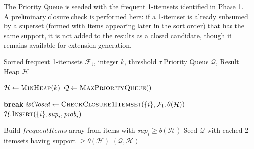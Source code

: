 \documentclass[10pt,letterpaper]{article}
\begin{document}
The Priority Queue is seeded with the frequent 1-itemsets identified in Phase 1. A preliminary closure check is performed here: if a 1-itemset is already subsumed by a superset (formed with items appearing later in the sort order) that has the same support, it is not added to the results as a closed candidate, though it remains available for extension generation.


\begin{algorithm}[H]
\caption{Phase 2: Initialization}
\label{alg:phase2}
\begin{algorithmic}[1]
\footnotesize
\REQUIRE Sorted frequent 1-itemsets $\mathcal{F}_1$, integer $k$, threshold $\tau$
\ENSURE Priority Queue $\mathcal{Q}$, Result Heap $\mathcal{H}$

\STATE $\mathcal{H} \leftarrow \textsc{MinHeap}(k)$
\STATE $\mathcal{Q} \leftarrow \textsc{MaxPriorityQueue}()$

        \STATE \textbf{break}
    \ENDIF
    \STATE $\mathit{isClosed} \leftarrow \textsc{CheckClosure1Itemset}(\{i\}, \mathcal{F}_1, \theta(\mathcal{H}))$
        \STATE $\mathcal{H}.\textsc{Insert}(\{i\}, \mathit{sup}_i, \mathit{prob}_i)$
    \ENDIF
\ENDFOR

\STATE Build $\mathit{frequentItems}$ array from items with $\mathit{sup}_i \ge \theta(\mathcal{H})$
\STATE Seed $\mathcal{Q}$ with cached 2-itemsets having support $\ge \theta(\mathcal{H})$
\RETURN $(\mathcal{Q}, \mathcal{H})$
\end{algorithmic}
\end{algorithm}
\end{document}
